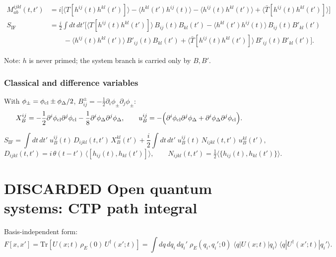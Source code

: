 \documentclass[12pt,a4paper,oneside]{article}
\numberwithin{equation}{section}   %
\begin{document}
\begin{align}
M^{ijkl}_{ab}(t,t') &= i\Big[
\langle T[h^{ij}(t)h^{kl}(t')]\rangle
-\langle h^{kl}(t')h^{ij}(t)\rangle
-\langle h^{ij}(t)h^{kl}(t')\rangle
+\langle \bar T[h^{ij}(t)h^{kl}(t')]\rangle
\Big]\\
S_{\mathrm{IF}} &= \frac{i}{2}\int dt\,dt'\Big[
\langle T[h^{ij}(t)h^{kl}(t')]\rangle\, B_{ij}(t)B_{kl}(t')
-\langle h^{kl}(t')h^{ij}(t)\rangle\, B_{ij}(t)B'_{kl}(t')\\
& \qquad -\langle h^{ij}(t)h^{kl}(t')\rangle\, B'_{ij}(t)B_{kl}(t')
+\langle \bar T[h^{ij}(t)h^{kl}(t')]\rangle\, B'_{ij}(t)B'_{kl}(t')
\Big].
\end{align}

Note: $h$ is never primed; the system branch is carried only by $B,B'$.

\subsubsection{Classical and difference variables}

With $\phi_\pm=\phi_{\rm cl}\pm\phi_\Delta/2$, $B^\pm_{ij}=-\tfrac12\partial_i\phi_\pm\partial_j\phi_\pm$:
\[
X_B^{ij} = -\frac12\partial^i\phi_{\rm cl}\partial^j\phi_{\rm cl} - \frac18\partial^i\phi_\Delta\partial^j\phi_\Delta, \qquad
u_B^{ij} = -\Big(\partial^i\phi_{\rm cl}\partial^j\phi_\Delta+\partial^i\phi_\Delta\partial^j\phi_{\rm cl}\Big).
\]

\[
S_{\mathrm{IF}}
=\int dt\,dt'\;u_B^{ij}(t)\,D_{ijkl}(t,t')\,X_B^{kl}(t')
+\frac{i}{2}\int dt\,dt'\;u_B^{ij}(t)\,N_{ijkl}(t,t')\,u_B^{kl}(t'),
\]
\[
D_{ijkl}(t,t')=i\,\theta(t-t')\,\langle[h_{ij}(t),h_{kl}(t')]\rangle,\qquad
N_{ijkl}(t,t')=\tfrac12\langle\{h_{ij}(t),h_{kl}(t')\}\rangle.
\]

\newpage

\section{DISCARDED Open quantum systems: CTP path integral}

Basis-independent form:
\begin{equation}
F[x,x']
=
\mathrm{Tr}
\!\left[
U(x;t)\,\rho_E(0)\,U^\dagger(x';t)
\right]
=
\int dq\,dq_i\,dq_i'\;
\rho_E(q_i,q_i';0)\;
\langle q|U(x;t)|q_i\rangle\;
\langle q|U^\dagger(x';t)|q_i'\rangle.
\end{equation}
\end{document}
